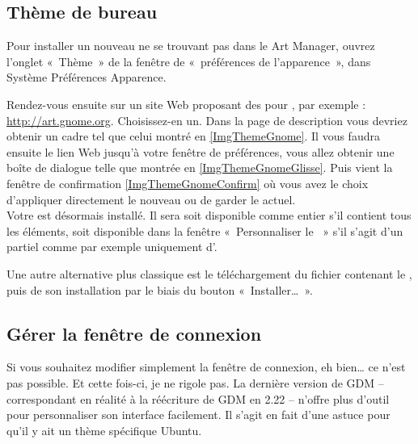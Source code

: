 \subsection{Thème de bureau}
Pour installer un nouveau  ne se trouvant pas dans le Art Manager, ouvrez l'onglet «~Thème~» de la fenêtre de «~préférences de l'apparence~», dans Système \FlecheDroite Préférences \FlecheDroite Apparence.\par
{}
\InstallationThemeGnome
Rendez-vous ensuite sur un site Web proposant des  pour , par exemple : \url{http://art.gnome.org}. Choisissez-en un. Dans la page de description vous devriez obtenir un cadre tel que celui montré en \ref{ImgThemeGnome}. Il vous faudra ensuite  le lien Web jusqu'à votre fenêtre de préférences, vous allez obtenir une boîte de dialogue telle que montrée en \ref{ImgThemeGnomeGlisse}. Puis vient la fenêtre de confirmation \ref{ImgThemeGnomeConfirm} où vous avez le choix d'appliquer directement le nouveau  ou de garder le  actuel.\\
Votre  est désormais installé. Il sera soit disponible comme  entier s'il contient tous les éléments, soit disponible dans la fenêtre «~Personnaliser le ~» s'il s'agit d'un  partiel comme par exemple uniquement d'.\par
Une autre alternative plus classique est le téléchargement du fichier contenant le , puis de son installation par le biais du bouton «~Installer\dots{}~».
\subsection{Gérer la fenêtre de connexion}
Si vous souhaitez modifier simplement la fenêtre de connexion, eh bien\ldots{} ce n'est pas possible. Et cette fois-ci, je ne rigole pas. La dernière version de GDM -- correspondant en réalité à la réécriture de GDM en 2.22 -- n'offre plus d'outil pour personnaliser son interface facilement. Il s'agit en fait d'une astuce pour qu'il y ait un thème spécifique Ubuntu.\par
